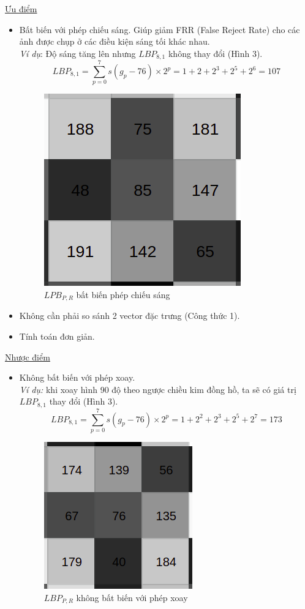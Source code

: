 \underline{Ưu điểm}
\begin{itemize}
	\item Bất biến với phép chiếu sáng. Giúp giảm FRR (False Reject Rate) cho các ảnh được chụp ở các điều kiện sáng tối khác nhau. \\
	\textit{Ví dụ}: Độ sáng tăng lên nhưng $LBP_{8,1}$ không thay đổi (Hình 3).
	$$
		LBP_{8,1} = \sum^{7}_{p=0}{s(g_p-76)\times 2^p} = 1 + 2 +2^3 + 2^5 + 2^6 = 107
	$$
	\begin{figure}[H]
		\begin{center}
			\includegraphics[scale=0.5]{images/theo1/LBP_exam2}
			\caption{$LPB_{P,R}$ bất biến phép chiếu sáng}
		\end{center}
	\end{figure}
	\item Không cần phải so sánh 2 vector đặc trưng (Công thức 1).
	\item Tính toán đơn giản.
\end{itemize}
\underline{Nhược điểm}
\begin{itemize}
	\item Không bất biến với phép xoay.\\
	\textit{Ví dụ:} khi xoay hình 90 độ theo ngược chiều kim đồng hồ, ta sẽ có giá trị $LBP_{8,1}$ thay đổi (Hình 3).
	$$
		LBP_{8,1} = \sum^{7}_{p=0}{s(g_p-76)\times 2^p} = 1 + 2^2 + 2^3 + 2^5 + 2^7 = 173
	$$
	\begin{figure}[H]
		\begin{center}
			\includegraphics[scale=0.6]{images/theo1/LBP_exam3}
			\caption{$LBP_{P,R}$ không bất biến với phép xoay}
		\end{center}
	\end{figure}
\end{itemize}


